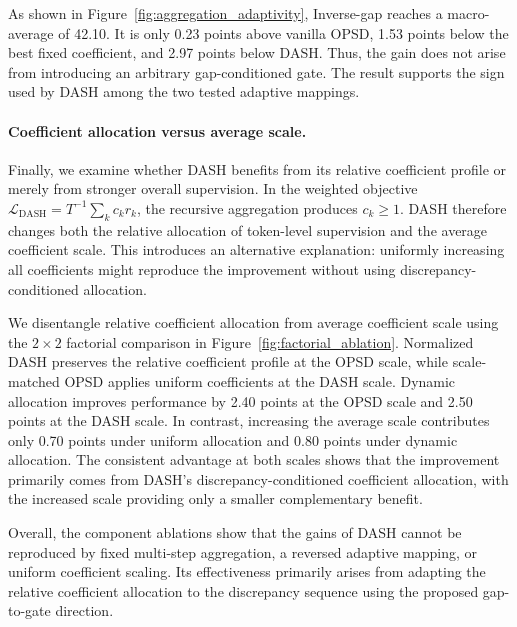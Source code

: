 \documentclass[letterpaper]{article} %
\begin{document}
As shown in Figure~\ref{fig:aggregation_adaptivity}, Inverse-gap reaches
a macro-average of 42.10. It is only 0.23 points above vanilla OPSD,
1.53 points below the best fixed coefficient, and 2.97 points below
DASH. Thus, the gain does not arise from introducing an arbitrary
gap-conditioned gate. The result supports the sign used by DASH among
the two tested adaptive mappings.

\paragraph{Coefficient allocation versus average scale.}
Finally, we examine whether DASH benefits from its relative coefficient
profile or merely from stronger overall supervision. In the weighted
objective
$\mathcal L_{\mathrm{DASH}}=T^{-1}\sum_k c_k r_k$, the recursive
aggregation produces $c_k\geq1$. DASH therefore changes both the
relative allocation of token-level supervision and the average
coefficient scale. This introduces an alternative explanation: uniformly
increasing all coefficients might reproduce the improvement without
using discrepancy-conditioned allocation.

We disentangle relative coefficient allocation from average coefficient
scale using the $2\times2$ factorial comparison in
Figure~\ref{fig:factorial_ablation}. Normalized DASH preserves the
relative coefficient profile at the OPSD scale, while scale-matched
OPSD applies uniform coefficients at the DASH scale. Dynamic allocation
improves performance by 2.40 points at the OPSD scale and 2.50 points at
the DASH scale. In contrast, increasing the average scale contributes
only 0.70 points under uniform allocation and 0.80 points under dynamic
allocation. The consistent advantage at both scales shows that the
improvement primarily comes from DASH's discrepancy-conditioned
coefficient allocation, with the increased scale providing only a
smaller complementary benefit.

Overall, the component ablations show that the gains of DASH cannot be
reproduced by fixed multi-step aggregation, a reversed adaptive mapping,
or uniform coefficient scaling. Its effectiveness primarily arises from
adapting the relative coefficient allocation to the discrepancy sequence
using the proposed gap-to-gate direction.

\end{document}

